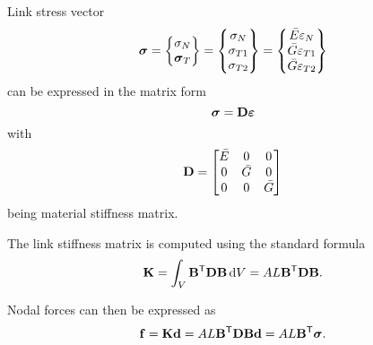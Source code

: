 Link stress vector
\begin{equation}
	\linkStressVector = \begin{Bmatrix}
		\linkStressNormal \\
		\linkStressShearVector
	\end{Bmatrix}
	 = \begin{Bmatrix}
		\linkStressNormal \\
		\linkStressShear[1] \\
		\linkStressShear[2]
	\end{Bmatrix}
	 = \begin{Bmatrix}
		\linkMaterialStiffnessNormal \linkStrainNormal \\
		\linkMaterialStiffnessShear \linkStrainShear[1] \\
		\linkMaterialStiffnessShear \linkStrainShear[2]
	\end{Bmatrix}
\end{equation}
can be expressed in the matrix form
\begin{equation}
	\linkStressVector = \linkMaterialStiffnessMatrix \linkStrainVector
\end{equation}
with
\begin{equation}
	\linkMaterialStiffnessMatrix = \begin{bmatrix}
		\linkMaterialStiffnessNormal & 0 & 0 \\
		0 & \linkMaterialStiffnessShear & 0 \\
		0 & 0 & \linkMaterialStiffnessShear
	\end{bmatrix}
\end{equation}
being material stiffness matrix.

The link stiffness matrix is computed using the standard formula
\begin{equation}
	\linkStiffnessMatrix =
	\int_\volume \linkStrainDisplacementMatrix\T\materialStiffnessMatrix\linkStrainDisplacementMatrix \dVolume
	=
	\linkCrossSectionArea\linkLength
	\linkStrainDisplacementMatrix\T\materialStiffnessMatrix\linkStrainDisplacementMatrix
	.
\end{equation}

Nodal forces can then be expressed as
\begin{equation}
	\linkNodalForceVector = \linkStiffnessMatrix\linkNodalDsplVector
	=
	\linkCrossSectionArea\linkLength
	\linkStrainDisplacementMatrix\T\materialStiffnessMatrix\linkStrainDisplacementMatrix\linkNodalDsplVector
	= \linkCrossSectionArea\linkLength \linkStrainDisplacementMatrix\T \linkStressVector
	.
\end{equation}

